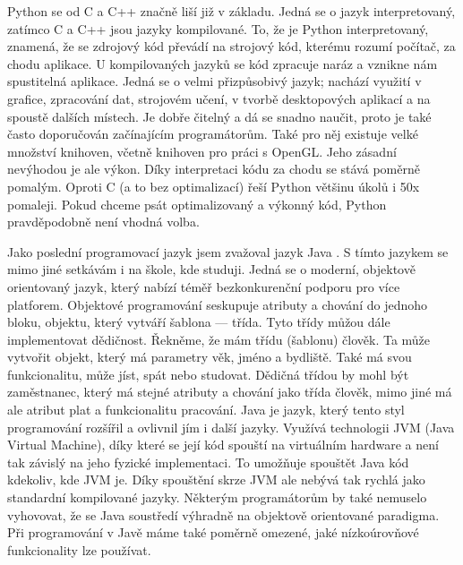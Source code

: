 \documentclass[12pt]{article}
\begin{document}
Python \cite{python} se od C a C++ značně liší již v základu. Jedná se o jazyk interpretovaný, zatímco C a C++ jsou jazyky kompilované. To, že je Python interpretovaný, znamená, že se zdrojový kód převádí na strojový kód, kterému rozumí počítač, za chodu aplikace. U  kompilovaných jazyků se kód zpracuje naráz a vznikne nám spustitelná aplikace. Jedná se o velmi přizpůsobivý jazyk; nachází využití v grafice, zpracování dat, strojovém učení, v tvorbě desktopových aplikací a na spoustě dalších místech. Je dobře čitelný a dá se snadno naučit, proto je také často doporučován začínajícím programátorům. Také pro něj existuje velké množství knihoven, včetně knihoven pro práci s OpenGL. Jeho zásadní nevýhodou je ale výkon. Díky interpretaci kódu za chodu se stává poměrně pomalým. Oproti C (a to bez optimalizací) řeší Python většinu úkolů i 50x pomaleji. Pokud chceme psát optimalizovaný a výkonný kód, Python pravděpodobně není vhodná volba.

Jako poslední programovací jazyk jsem zvažoval jazyk Java \cite{java}. S tímto jazykem se mimo jiné setkávám i na škole, kde studuji. Jedná se o moderní, objektově orientovaný jazyk, který nabízí téměř bezkonkurenční podporu pro více platforem. Objektové programování \cite{oop} seskupuje atributy a chování do jednoho bloku, objektu, který vytváří šablona — třída. Tyto třídy můžou dále implementovat dědičnost. Řekněme, že mám třídu (šablonu) člověk. Ta může vytvořit objekt, který má parametry věk, jméno a bydliště. Také má svou funkcionalitu, může jíst, spát nebo studovat. Dědičná třídou by mohl být zaměstnanec, který má stejné atributy a chování jako třída člověk, mimo jiné má ale atribut plat a funkcionalitu pracování. Java je jazyk, který tento styl programování rozšířil a ovlivnil jím i další jazyky. Využívá technologii JVM (Java Virtual Machine)\cite{jvm}, díky které se její kód spouští na virtuálním hardware a není tak závislý na jeho fyzické implementaci. To umožňuje spouštět Java kód kdekoliv, kde JVM je. Díky spouštění skrze JVM ale nebývá tak rychlá jako standardní kompilované jazyky. Některým programátorům by také nemuselo vyhovovat, že se Java soustředí výhradně na objektově orientované paradigma. Při programování v Javě máme také poměrně omezené, jaké nízkoúrovňové funkcionality lze používat.
\end{document}
